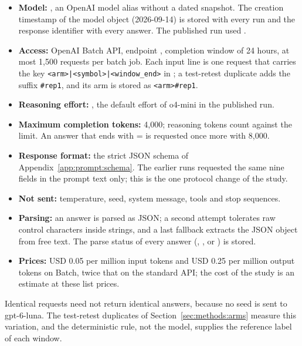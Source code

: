 \begin{itemize}[leftmargin=*,labelsep=5.5mm]
\item \textbf{Model:} , an OpenAI model alias without a dated snapshot. The creation timestamp of the model object (2026-09-14) is stored with every run and the response identifier with every answer. The published run used .
\item \textbf{Access:} OpenAI Batch API, endpoint , completion window of 24 hours, at most 1{,}500 requests per batch job. Each input line is one request that carries the key \texttt{<arm>|<symbol>|<window\_end>} in ; a test-retest duplicate adds the suffix \texttt{\#rep1}, and its arm is stored as \texttt{<arm>\#rep1}.
\item \textbf{Reasoning effort:} , the default effort of o4-mini in the published run.
\item \textbf{Maximum completion tokens:} 4{,}000; reasoning tokens count against the limit. An answer that ends with  =  is requested once more with 8{,}000.
\item \textbf{Response format:} the strict JSON schema of Appendix~\ref{app:prompt:schema}. The earlier runs requested the same nine fields in the prompt text only; this is the one protocol change of the study.
\item \textbf{Not sent:} temperature, seed, system message, tools and stop sequences.
\item \textbf{Parsing:} an answer is parsed as JSON; a second attempt tolerates raw control characters inside strings, and a last fallback extracts the JSON object from free text. The parse status of every answer (, ,  or ) is stored.
\item \textbf{Prices:} USD 0.05 per million input tokens and USD 0.25 per million output tokens on Batch, twice that on the standard API; the cost of the study is an estimate at these list prices.
\end{itemize}

Identical requests need not return identical answers, because no seed is sent to gpt-6-luna. The test-retest duplicates of Section~\ref{sec:methods:arms} measure this variation, and the deterministic rule, not the model, supplies the reference label of each window.

